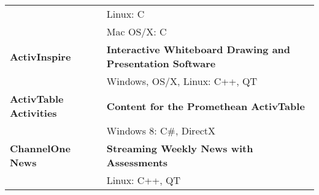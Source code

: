 \begin{tabular}{ p{4cm} p{10.5cm} }
 & Linux: C\\
 & Mac OS/X: C\\
\midrule
\textbf{ActivInspire} & \textbf{Interactive Whiteboard Drawing and Presentation Software}\\
 & Windows, OS/X, Linux: C++, QT\\
\midrule
\textbf{ActivTable Activities} & \textbf{Content for the Promethean ActivTable}\\
 & Windows 8: C\#, DirectX\\
\midrule
\textbf{ChannelOne News} & \textbf{Streaming Weekly News with Assessments}\\
 & Linux: C++, QT\\
\end{tabular}
